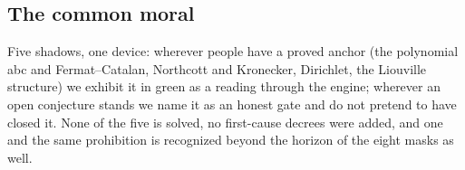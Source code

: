 \subsection{The common moral}

Five shadows, one device: wherever people have a proved anchor (the polynomial abc and
Fermat–Catalan, Northcott and Kronecker, Dirichlet, the Liouville structure) we exhibit it in green
as a reading through the engine; wherever an open conjecture stands we name it as an honest gate and
do not pretend to have closed it. None of the five is solved, no first-cause decrees were added, and
one and the same prohibition is recognized beyond the horizon of the eight masks as well.
